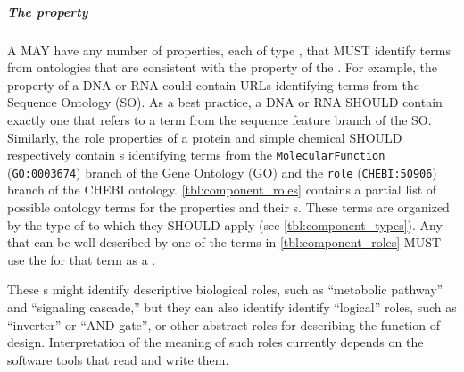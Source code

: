 \subparagraph{The  property}
\label{sec:role:C}

A  MAY have any number of  properties, each of type , that MUST identify terms from ontologies that are consistent with the  property of the .  
For example, the  property of a DNA or RNA  could contain URLs identifying terms from the Sequence Ontology (SO). As a best practice, a DNA or RNA  SHOULD contain exactly one  that refers to a term from the sequence feature branch of the SO.
Similarly, the role properties of a protein and simple chemical  SHOULD respectively contain s identifying terms from the \texttt{MolecularFunction} (\texttt{GO:0003674}) branch of the Gene Ontology (GO) and the \texttt{role} (\texttt{CHEBI:50906}) branch of the CHEBI ontology.
\ref{tbl:component_roles} contains a partial list of possible ontology terms for the  properties and their s. These terms are organized by the type of  to which they SHOULD apply (see \ref{tbl:component_types}). Any  that can be well-described by one of the terms in \ref{tbl:component_roles} MUST use the  for that term as a .

These s might identify descriptive biological roles, such as ``metabolic pathway'' and ``signaling cascade,'' but they can also identify identify ``logical'' roles, such as ``inverter'' or ``AND gate'', or other abstract roles for describing the function of design. Interpretation of the meaning of such roles currently depends on the software tools that read and write them.

